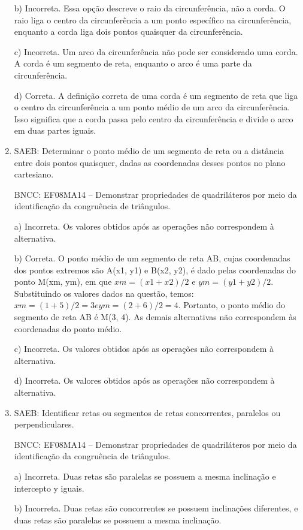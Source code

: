 \begin{enumerate}
b) Incorreta. Essa opção descreve o raio da circunferência, não a
corda. O raio liga o centro da circunferência a um ponto específico na
circunferência, enquanto a corda liga dois pontos quaisquer da
circunferência.

c) Incorreta. Um arco da circunferência não pode ser considerado
uma corda. A corda é um segmento de reta, enquanto o arco é uma parte da
circunferência.

d) Correta. A definição correta de uma corda é um segmento de reta
que liga o centro da circunferência a um ponto médio de um arco da
circunferência. Isso significa que a corda passa pelo centro da
circunferência e divide o arco em duas partes iguais.

\item SAEB: Determinar o ponto médio de um segmento de reta ou a distância
entre dois pontos quaisquer, dadas as coordenadas desses pontos no plano
cartesiano.

BNCC: EF08MA14 -- Demonstrar propriedades de quadriláteros por meio da
identificação da congruência de triângulos.

a) Incorreta. Os valores obtidos após as operações não correspondem
à alternativa.

b) Correta. O ponto médio de um segmento de reta AB, cujas
coordenadas dos pontos extremos são A(x1, y1) e B(x2, y2), é dado pelas
coordenadas do ponto M(xm, ym), em que $xm = (x1 + x2)/2$ e $ym = (y1 +
y2)/2$. Substituindo os valores dados na questão, temos: $xm = (1 + 5)/2 =
3 e ym = (2 + 6)/2 = 4$. Portanto, o ponto médio do segmento de reta AB é
M(3, 4). As demais alternativas não correspondem às coordenadas do ponto
médio.

c) Incorreta. Os valores obtidos após as operações não correspondem
à alternativa.

d) Incorreta. Os valores obtidos após as operações não correspondem
à alternativa.

\item SAEB: Identificar retas ou segmentos de retas concorrentes, paralelos ou
perpendiculares.

BNCC: EF08MA14 -- Demonstrar propriedades de quadriláteros por meio da
identificação da congruência de triângulos.

a) Incorreta. Duas retas são paralelas se possuem a mesma
inclinação e intercepto y iguais.

b) Incorreta. Duas retas são concorrentes se possuem inclinações
diferentes, e duas retas são paralelas se possuem a mesma inclinação.


\end{enumerate}
